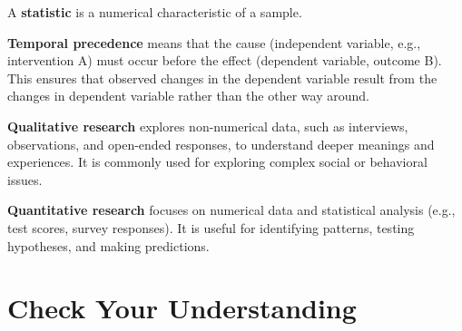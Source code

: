 \documentclass[
  letterpaper,
  DIV=11,
  numbers=noendperiod]{scrreprt}
\begin{document}
A \textbf{statistic} is a numerical characteristic of a sample.

\textbf{Temporal precedence} means that the cause (independent variable,
e.g., intervention A) must occur before the effect (dependent variable,
outcome B). This ensures that observed changes in the dependent variable
result from the changes in dependent variable rather than the other way
around.

\textbf{Qualitative research} explores non-numerical data, such as
interviews, observations, and open-ended responses, to understand deeper
meanings and experiences. It is commonly used for exploring complex
social or behavioral issues.

\textbf{Quantitative research} focuses on numerical data and statistical
analysis (e.g., test scores, survey responses). It is useful for
identifying patterns, testing hypotheses, and making predictions.

\section*{Check Your Understanding}\label{check-your-understanding}

\end{document}
